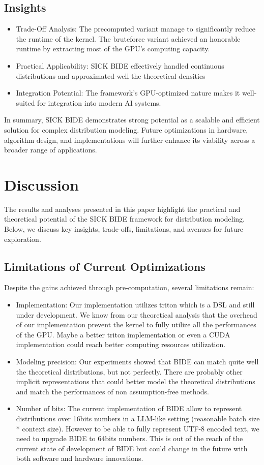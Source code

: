 \documentclass{article}
\begin{document}
\subsection{Insights}
\begin{itemize}
    \item Trade-Off Analysis: The precomputed variant manage to significantly reduce the runtime of the kernel. The bruteforce variant achieved an honorable runtime by  extracting most of the GPU's computing capacity.
    \item Practical Applicability: SICK BIDE effectively handled continuous distributions and approximated well the theoretical densities
    \item Integration Potential: The framework’s GPU-optimized nature makes it well-suited for integration into modern AI systems.
\end{itemize}

In summary, SICK BIDE demonstrates strong potential as a scalable and efficient solution for complex distribution modeling. Future optimizations in hardware, algorithm design, and implementations will further enhance its viability across a broader range of applications.

\section{Discussion}
The results and analyses presented in this paper highlight the practical and theoretical potential of the SICK BIDE framework for distribution modeling. Below, we discuss key insights, trade-offs, limitations, and avenues for future exploration.

\subsection{Limitations of Current Optimizations}
Despite the gains achieved through pre-computation, several limitations remain:
\begin{itemize}
    \item Implementation: Our implementation utilizes triton which is a DSL and still under development. We know from our theoretical analysis that the overhead of our implementation prevent the kernel to fully utilize all the performances of the GPU. Maybe a better triton implementation or even a CUDA implementation could reach better computing resources utilization.
    \item Modeling precision: Our experiments showed that BIDE can match quite well the theoretical distributions, but not perfectly. There are probably other implicit representations that could better model the theoretical distributions and match the performances of non assumption-free methods. 
    \item Number of bits: The current implementation of BIDE allow to represent distributions over 16bits numbers in a LLM-like setting (reasonable batch size * context size). However to be able to fully represent UTF-8 encoded text, we need to upgrade BIDE to 64bits numbers. This is out of the reach of the current state of development of BIDE but could change in the future with both software and hardware innovations. 
\end{itemize}
\end{document}
